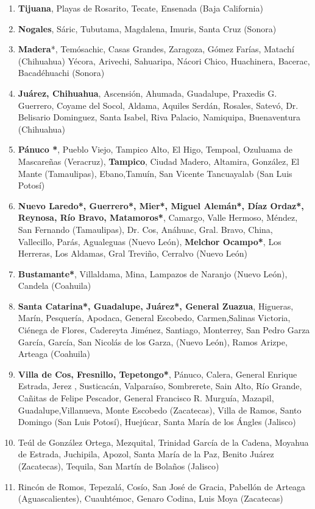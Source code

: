 \documentclass{article}[11 pt]
\begin{document}
\begin{enumerate}
\item \textbf{Tijuana}, Playas de Rosarito, Tecate, Ensenada (Baja California)
\item \textbf{Nogales}, Sáric, Tubutama, Magdalena, Imuris, Santa Cruz (Sonora)
\item \textbf{Madera}*, Temósachic, Casas Grandes, Zaragoza, Gómez Farías, Matachí (Chihuahua) Yécora, Arivechi, Sahuaripa, Nácori Chico, Huachinera, Bacerac, Bacadéhuachi (Sonora)
\item \textbf{Juárez, Chihuahua}, Ascensión, Ahumada, Guadalupe, Praxedis G. Guerrero, Coyame del Socol, Aldama, Aquiles Serdán, Rosales, Satevó, Dr. Belisario Dominguez, Santa Isabel, Riva Palacio, Namiquipa, Buenaventura (Chihuahua)
\item \textbf{Pánuco *}, Pueblo Viejo, Tampico Alto, El Higo, Tempoal, Ozuluama de Mascareñas (Veracruz), \textbf{Tampico}, Ciudad Madero, Altamira, González, El Mante (Tamaulipas), Ebano,Tamuín, San Vicente Tancuayalab (San Luis Potosí)
\item\textbf{ Nuevo Laredo*, Guerrero*, Mier*, Miguel Alemán*, Díaz Ordaz*, Reynosa, Río Bravo, Matamoros*}, Camargo, Valle Hermoso, Méndez, San Fernando (Tamaulipas), Dr. Cos, Anáhuac, Gral. Bravo, China, Vallecillo, Parás, Agualeguas (Nuevo León), \textbf{Melchor Ocampo*}, Los Herreras, Los Aldamas, Gral Treviño, Cerralvo (Nuevo León)
\item\textbf{ Bustamante*}, Villaldama, Mina, Lampazos de Naranjo (Nuevo León), Candela (Coahuila)
\item \textbf{Santa Catarina*, Guadalupe, Juárez*, General Zuazua}, Higueras, Marín, Pesquería, Apodaca, General Escobedo, Carmen,Salinas Victoria, Ciénega de Flores, Cadereyta Jiménez, Santiago, Monterrey, San Pedro Garza García, García, San Nicolás de los Garza, (Nuevo León), Ramos Arizpe, Arteaga (Coahuila)
\item \textbf{Villa de Cos, Fresnillo, Tepetongo*}, Pánuco, Calera, General Enrique Estrada, Jerez , Susticacán, Valparaíso, Sombrerete, Sain Alto, Río Grande, Cañitas de Felipe Pescador, General Francisco R. Murguía, Mazapil, Guadalupe,Villanueva, Monte Escobedo (Zacatecas), Villa de Ramos,  Santo Domingo  (San Luis Potosí), Huejúcar, Santa María de los Ángles (Jalisco)
\item Teúl de González Ortega, Mezquital, Trinidad García de la Cadena, Moyahua de Estrada, Juchipila, Apozol, Santa María de la Paz, Benito Juárez (Zacatecas), Tequila, San Martín de Bolaños (Jalisco)
\item Rincón de Romos, Tepezalá, Cosío, San José de Gracia, Pabellón de Arteaga (Aguascalientes), Cuauhtémoc, Genaro Codina, Luis Moya (Zacatecas)

\end{enumerate}
\end{document}
